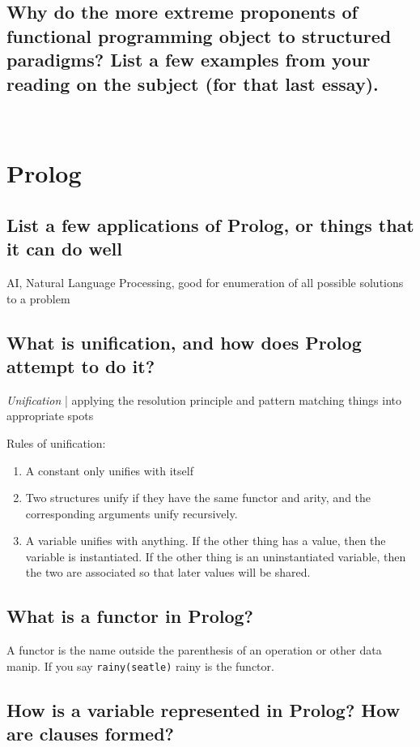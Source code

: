 \documentclass{article}
\newcommand{\define}[1]{\noindent\textit{#1} | }
\begin{document}
\subsection{Why do the more extreme proponents of functional programming object to structured paradigms? List a few examples from your reading on the subject (for that last essay).}

~

\section{Prolog}

\subsection{List a few applications of Prolog, or things that it can do well}

AI, Natural Language Processing, good for enumeration of all possible solutions to a problem

\subsection{What is unification, and how does Prolog attempt to do it?}

\define{Unification} applying the resolution principle and pattern matching things into appropriate spots

\noindent Rules of unification:
\begin{enumerate}
	\item A constant only unifies with itself
	\item Two structures unify if they have the same functor and arity, and the corresponding arguments unify recursively.
	\item A variable unifies with anything. If the other thing has a value, then the variable is instantiated. If the other thing is an uninstantiated variable, then the two are associated so that later values will be shared.
\end{enumerate}

\subsection{What is a functor in Prolog?}

A functor is the name outside the parenthesis of an operation or other data manip. If you say \verb|rainy(seatle)| rainy is the functor.

\subsection{How is a variable represented in Prolog? How are clauses formed?}
\end{document}
